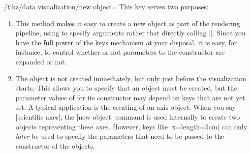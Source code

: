 \begin{key}{/tikz/data visualization/new object=}
    This key serves two purposes:
    \begin{enumerate}
        \item This method makes it easy to create a new object as part of the
            rendering pipeline, using  to specify arguments
            rather that directly calling |\pgfoonew|. Since you have the full
            power of the keys mechanism at your disposal, it is easy, for
            instance, to control whether or not parameters to the constructor
            are expanded or not.
        \item The object is not created immediately, but only just before the
            visualization starts. This allows you to specify that an object
            must be created, but the parameter values of for its constructor
            may depend on keys that are not yet set. A typical application is
            the creating of an axis object: When you say |scientific axes|, the
            |new object| command is used internally to create two objects
            representing these axes. However, keys like |x={length=5cm}| can
            only \emph{later} be used to specify the parameters that need to be
            passed to the constructor of the objects.
  \end{enumerate}


\end{key}
